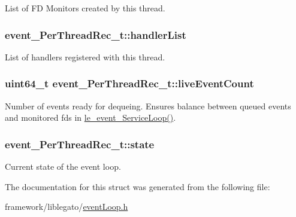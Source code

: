 List of FD Monitors created by this thread. 

\subsubsection[{\texorpdfstring{handler\+List}{handlerList}}]{ event\+\_\+\+Per\+Thread\+Rec\+\_\+t\+::handler\+List}\hypertarget{structevent___per_thread_rec__t_aaa495d6cf8b48b83815db112898c4cd9}{}\label{structevent___per_thread_rec__t_aaa495d6cf8b48b83815db112898c4cd9}


List of handlers registered with this thread. 

\subsubsection[{\texorpdfstring{live\+Event\+Count}{liveEventCount}}]{\setlength{\rightskip}{0pt plus 5cm}uint64\+\_\+t event\+\_\+\+Per\+Thread\+Rec\+\_\+t\+::live\+Event\+Count}\hypertarget{structevent___per_thread_rec__t_a8c08fbd7cf94a02fd532104dadfa49c8}{}\label{structevent___per_thread_rec__t_a8c08fbd7cf94a02fd532104dadfa49c8}
Number of events ready for dequeing. Ensures balance between queued events and monitored fds in \hyperlink{le__event_loop_8h_a096222e98f6a0d92a79722018a752b58}{le\+\_\+event\+\_\+\+Service\+Loop()}. 
\subsubsection[{\texorpdfstring{state}{state}}]{ event\+\_\+\+Per\+Thread\+Rec\+\_\+t\+::state}\hypertarget{structevent___per_thread_rec__t_a19c485f81539bfdfe8092178510af8d4}{}\label{structevent___per_thread_rec__t_a19c485f81539bfdfe8092178510af8d4}


Current state of the event loop. 



The documentation for this struct was generated from the following file\+:\begin{DoxyCompactItemize}
\item 
framework/liblegato/\hyperlink{event_loop_8h}{event\+Loop.\+h}\end{DoxyCompactItemize}

